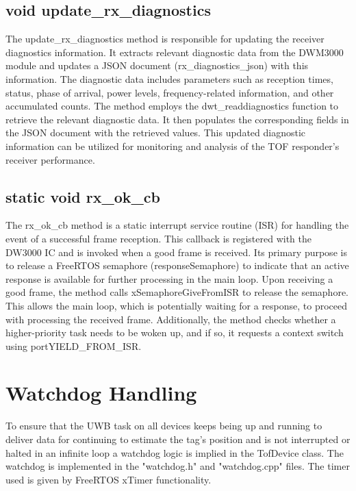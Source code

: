 \subsection{void update\_rx\_diagnostics}
\label{subsec:TofResponder_update_rx_diagnostics}
The update\_rx\_diagnostics method is responsible for updating the receiver diagnostics information. 
It extracts relevant diagnostic data from the DWM3000 module and updates a JSON document (rx\_diagnostics\_json) with this information. 
The diagnostic data includes parameters such as reception times, status, phase of arrival, power levels, frequency-related information, and other accumulated counts.
\vspace{4pt}
\newline
The method employs the dwt\_readdiagnostics function to retrieve the relevant diagnostic data. 
It then populates the corresponding fields in the JSON document with the retrieved values. 
This updated diagnostic information can be utilized for monitoring and analysis of the TOF responder's receiver performance. 

\subsection{static void rx\_ok\_cb}
\label{subsec:TofResponder_rx_ok_cb}
The rx\_ok\_cb method is a static interrupt service routine (ISR) for handling the event of a successful frame reception. 
This callback is registered with the DW3000 IC and is invoked when a good frame is received. 
Its primary purpose is to release a FreeRTOS semaphore (responseSemaphore) to indicate that an active response is available for further processing in the main loop.
\vspace{4pt}
\newline
Upon receiving a good frame, the method calls xSemaphoreGiveFromISR to release the semaphore. This allows the main loop, which is potentially waiting for a response, to proceed with processing the received frame. Additionally, the method checks whether a higher-priority task needs to be woken up, and if so, it requests a context switch using portYIELD\_FROM\_ISR.

\section{Watchdog Handling}
\label{sec:Watchdog_Handling}
To ensure that the UWB task on all devices keeps being up and running to deliver data for continuing to estimate the tag's position and is not interrupted or halted in an infinite loop a watchdog logic is implied in the TofDevice class. 
The watchdog is implemented in the "watchdog.h" and "watchdog.cpp" files. 
The timer used is given by FreeRTOS xTimer functionality. 

